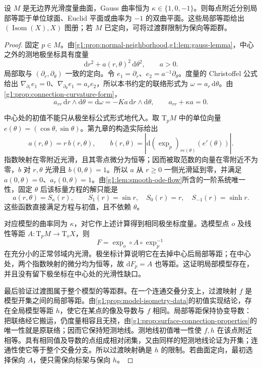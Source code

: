 \begin{proposition}
	\label{g1:prop:constant-curvature-local-model}
	设 \(M\) 是无边界光滑度量曲面，Gauss 曲率恒为 \(\kappa\in\{1,0,-1\}\)。则每点附近分别局部等距于单位球面、Euclid 平面或曲率为 \(-1\) 的双曲平面。这些局部等距给出 \((\operatorname{Isom}(X),X)\) 图册；若 \(M\) 已定向，可将过渡群限制为保向等距群。
\end{proposition}
\begin{proof}
	固定 \(p\in M\)。由\cref{g1:prop:normal-neighborhood,g1:lem:gauss-lemma}，中心之外的测地极坐标具有度量
	\[
		\mathrm{d}r^2+a(r,\theta)^2\,\mathrm{d}\theta^2,\qquad a>0.
	\]
	局部取与 \((\partial_r,\partial_\theta)\) 一致的定向。令 \(e_1=\partial_r\)、\(e_2=a^{-1}\partial_\theta\)。度量的 Christoffel 公式给出 \(\nabla_{\partial_r}e_1=0\)、\(\nabla_{\partial_\theta}e_1=a_r e_2\)，所以本书约定的联络形式为 \(\omega=a_r\,\mathrm{d}\theta\)。由\cref{g1:prop:connection-curvature-form}，
	\[
		a_{rr}\,\mathrm{d}r\wedge\mathrm{d}\theta
		=\mathrm{d}\omega=-K a\,\mathrm{d}r\wedge\mathrm{d}\theta,
		\qquad a_{rr}+\kappa a=0.
	\]

	中心处的初值不能只从极坐标公式形式地代入。取 \(\mathrm{T}_pM\) 中的单位向量 \(e(\theta)=(\cos\theta,\sin\theta)\)。第九章的构造实际给出
	\[
		a(r,\theta)=r\,b(r,\theta),\qquad
		b(r,\theta)=\left|\mathrm{d}(\exp_p)_{re(\theta)}(e'(\theta))\right|.
	\]
	指数映射在零附近光滑，且其零点微分为恒等；因而被取范数的向量在零附近不为零，\(b\) 对 \(r,\theta\) 光滑且 \(b(0,\theta)=1\)。所以 \(a\) 从 \(r\ge0\) 一侧光滑延到零，并满足 \(a(0,\theta)=0\)、\(a_r(0,\theta)=1\)。由\cref{g1:lem:smooth-ode-flow}所含的一阶系统唯一性，固定 \(\theta\) 后该标量方程的解只能是
	\[
		a(r,\theta)=S_\kappa(r),\qquad
		S_1(r)=\sin r,\quad S_0(r)=r,\quad S_{-1}(r)=\sinh r.
	\]
	这些函数直接满足方程与初值，且不依赖 \(\theta\)。

	对应模型的曲率同为 \(\kappa\)，对它作上述计算得到相同极坐标度量。选模型点 \(o\) 及线性等距 \(A:\mathrm{T}_pM\to \mathrm{T}_oX\)，则
	\[
		F=\exp_o\circ A\circ\exp_p^{-1}
	\]
	在充分小的正常邻域内光滑。极坐标计算说明它在去掉中心后局部等距；在中心处，两个指数映射的微分均为恒等，故 \(\mathrm{d}F_p=A\) 也等距。这证明局部模型存在，并且没有留下极坐标在中心处的光滑性缺口。

	最后验证过渡图属于整个模型的等距群。在一个连通交叠分支上，过渡映射 \(f\) 是模型开集之间的局部等距。由\cref{g1:prop:model-isometry-data}的初值实现结论，存在全局模型等距 \(h\)，使它在某点的像及导数与 \(f\) 相同。局部等距保持协变导数：把联络经它搬运，仍度量相容且无挠，由\cref{g1:prop:surface-connection-properties}的唯一性就是原联络；因而它保持短测地线。测地线初值唯一性使 \(f,h\) 在该点附近相等。具有相同值及导数的点组成相对闭集，又由同样的短测地线论证为开集；连通性使它等于整个交叠分支。所以过渡映射确是 \(h\) 的限制。若曲面定向，最初选择保向 \(A\)，便只需保向标架与保向 \(h\)。
\end{proof}
